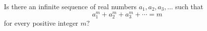 Is there an infinite sequence of real numbers $a_1,a_2,a_3,\dots$ such that
\[a_1^m+a_2^m+a_3^m+\cdots=m\]
for every positive integer $m?$